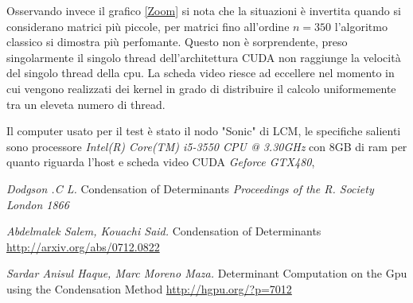 \documentclass{article}
\begin{document}
Osservando invece il grafico \ref{Zoom} si nota che la situazioni è invertita quando si considerano matrici più piccole, per matrici fino all'ordine $n = 350$ l'algoritmo classico si dimostra più perfomante. Questo non è sorprendente, preso singolarmente il singolo thread dell'architettura CUDA non raggiunge la velocità del singolo thread della cpu.
La scheda video riesce ad eccellere nel momento in cui vengono realizzati dei kernel in grado di distribuire il calcolo uniformemente tra un eleveta numero di thread.


Il computer usato per il test è stato il nodo "Sonic" di LCM, le specifiche salienti sono processore \textit{Intel(R) Core(TM) i5-3550 CPU @ 3.30GHz} con 8GB di ram
per quanto riguarda l'host e scheda video CUDA \textit{Geforce GTX480},

\newpage
\begin{thebibliography}{99}
 \textit{Dodgson .C L.} Condensation of Determinants \textit{Proceedings of the R. Society London 1866 }

 \textit{Abdelmalek Salem, Kouachi Said.} Condensation of Determinants \url{http://arxiv.org/abs/0712.0822}

 \textit{Sardar Anisul Haque, Marc Moreno Maza.} Determinant Computation on the Gpu using the Condensation Method \url{http://hgpu.org/?p=7012}


\end{thebibliography}
\end{document}
